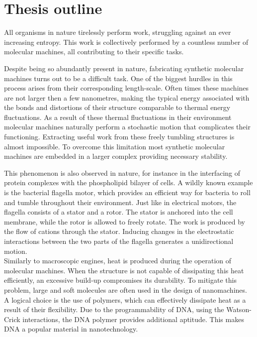 \section{Thesis outline}

All organisms in nature tirelessly perform work, struggling against an ever increasing
entropy. This work is collectively performed by a countless number of molecular machines,
all contributing to their specific tasks.

Despite being so abundantly present in nature, fabricating synthetic molecular machines
turns out to be a difficult task. One of the biggest hurdles in this process arises from
their corresponding length-scale. Often times these machines are not larger then
a few nanometres, making the typical energy associated with the bonds and
distortions of their structure comparable to thermal energy fluctuations. As a result of
these thermal fluctuations in their environment molecular machines naturally perform
a stochastic motion that complicates their functioning.  Extracting useful work from
these freely tumbling structures is almost impossible. To overcome this limitation most
synthetic molecular machines are embedded in a larger complex providing necessary
stability.\cite{Watson2016}

This phenomenon is also observed in nature, for instance in the interfacing of protein
complexes with the phospholipid bilayer of cells.  A wildly known example is the
bacterial flagella motor, which provides an efficient way for bacteria to
roll and tumble throughout their environment. Just like in electrical motors, the
flagella consists of a stator and a rotor. The stator is anchored into the cell membrane,
while the rotor is allowed to freely rotate. The work is produced by the flow of cations
through the stator. Inducing changes in the electrostatic interactions between the two
parts of the flagella generates a unidirectional motion.\cite{sowa_berry_2008}\\

Similarly to macroscopic engines, heat is produced during the operation of molecular
machines. When the structure is not capable of dissipating this heat efficiently, an
excessive build-up compromises its durability. To mitigate this problem, large and soft
molecules are often used in the design of nanomachines. A logical choice
is the use of polymers, which can effectively dissipate heat as a result of their
flexibility.  Due to the programmability of DNA, using the Watson-Crick interactions,
the DNA polymer provides additional aptitude. This makes DNA a popular material in
nanotechnology.

